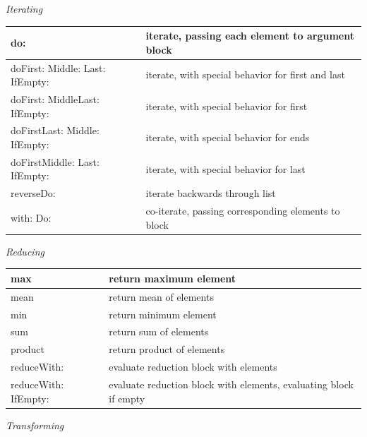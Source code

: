 \documentclass[letterpaper,10pt,english]{sphinxmanual}
\begin{document}
\emph{Iterating}

\begin{tabulary}{\linewidth}{p{5cm} p{10cm}}
\hline

do:
 & 
iterate, passing each element to argument block
\\\hline

doFirst: Middle: Last: IfEmpty:
 & 
iterate, with special behavior for first and last
\\\hline

doFirst: MiddleLast: IfEmpty:
 & 
iterate, with special behavior for first
\\\hline

doFirstLast: Middle: IfEmpty:
 & 
iterate, with special behavior for ends
\\\hline

doFirstMiddle: Last: IfEmpty:
 & 
iterate, with special behavior for last
\\\hline

reverseDo:
 & 
iterate backwards through list
\\\hline

with: Do:
 & 
co-iterate, passing corresponding elements to block
\\\hline
\end{tabulary}


\emph{Reducing}

\begin{tabulary}{\linewidth}{p{5cm} p{10cm}}
\hline

max
 & 
return maximum element
\\\hline

mean
 & 
return mean of elements
\\\hline

min
 & 
return minimum element
\\\hline

sum
 & 
return sum of elements
\\\hline

product
 & 
return product of elements
\\\hline

reduceWith:
 & 
evaluate reduction block with elements
\\\hline

reduceWith: IfEmpty:
 & 
evaluate reduction block with elements, evaluating block if empty
\\\hline
\end{tabulary}


\emph{Transforming}
\end{document}

